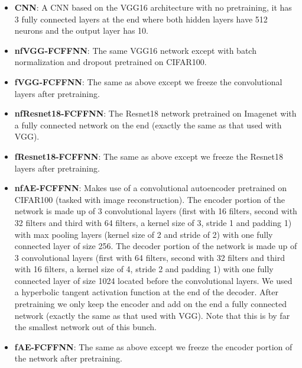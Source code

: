\begin{itemize}
    \item \textbf{CNN}: A CNN based on the VGG16 architecture \cite{simonyan2014very} with no pretraining, it has 3 fully connected layers at the end where both hidden layers have 512 neurons and the output layer has 10.
    \item \textbf{nfVGG-FCFFNN}: The same VGG16 network except with batch normalization \cite{ioffe2015batch} and dropout \cite{srivastava2014dropout} pretrained on CIFAR100.
    \item \textbf{fVGG-FCFFNN}: The same as above except we freeze the convolutional layers after pretraining.
    \item \textbf{nfResnet18-FCFFNN}: The Resnet18 network \cite{he2016deep} pretrained on Imagenet with a fully connected network on the end (exactly the same as that used with VGG).
    \item \textbf{fResnet18-FCFFNN}: The same as above except we freeze the Resnet18 layers after pretraining.
    \item \textbf{nfAE-FCFFNN}: Makes use of a convolutional autoencoder pretrained on CIFAR100 (tasked with image reconstruction). The encoder portion of the network is made up of 3 convolutional layers (first with 16 filters, second with 32 filters and third with 64 filters, a kernel size of 3, stride 1 and padding 1) with max pooling layers (kernel size of 2 and stride of 2) with one fully connected layer of size 256. The decoder portion of the network is made up of 3 convolutional layers (first with 64 filters, second with 32 filters and third with 16 filters, a kernel size of 4, stride 2 and padding 1) with one fully connected layer of size 1024 located before the convolutional layers. We used a hyperbolic tangent activation function at the end of the decoder. After pretraining we only keep the encoder and add on the end a fully connected network (exactly the same as that used with VGG). Note that this is by far the smallest network out of this bunch.
    \item \textbf{fAE-FCFFNN}: The same as above except we freeze the encoder portion of the network after pretraining.
\end{itemize}
